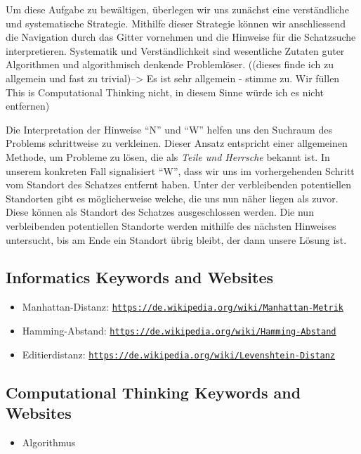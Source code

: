 \documentclass[a4paper,11pt]{report}
\newcommand{\BrochureUrlText}[1]{\texttt{#1}}
\begin{document}
Um diese Aufgabe zu bewältigen, überlegen wir uns zunächst eine verständliche und systematische Strategie. Mithilfe dieser Strategie können wir anschliessend die Navigation durch das Gitter vornehmen und die Hinweise für die Schatzsuche interpretieren. Systematik und Verständlichkeit sind wesentliche Zutaten guter Algorithmen und algorithmisch denkende Problemlöser. ((dieses finde ich zu allgemein und fast zu trivial)–> Es ist sehr allgemein - stimme zu. Wir füllen This is Computational Thinking nicht, in diesem Sinne würde ich es nicht entfernen)

Die Interpretation der Hinweise \enquote{N} und \enquote{W} helfen uns den Suchraum des Problems schrittweise zu verkleinen. Dieser Ansatz entspricht einer allgemeinen Methode, um Probleme zu lösen, die als \emph{Teile und Herrsche} bekannt ist. In unserem konkreten Fall signalisiert \enquote{W}, dass wir uns im vorhergehenden Schritt vom Standort des Schatzes entfernt haben. Unter der verbleibenden potentiellen Standorten gibt es möglicherweise welche, die uns nun näher liegen als zuvor. Diese können als Standort des Schatzes ausgeschlossen werden. Die nun verbleibenden potentiellen Standorte werden mithilfe des nächsten Hinweises untersucht, bis am Ende ein Standort übrig bleibt, der dann unsere Lösung ist.


\subsection*{Informatics Keywords and Websites}

\begin{itemize}
  \item Manhattan-Distanz: \href{https://de.wikipedia.org/wiki/Manhattan-Metrik}{\BrochureUrlText{https://de.wikipedia.org/wiki/Manhattan-Metrik}}
  \item Hamming-Abstand: \href{https://de.wikipedia.org/wiki/Hamming-Abstand}{\BrochureUrlText{https://de.wikipedia.org/wiki/Hamming-Abstand}}
  \item Editierdistanz: \href{https://de.wikipedia.org/wiki/Levenshtein-Distanz}{\BrochureUrlText{https://de.wikipedia.org/wiki/Levenshtein-Distanz}}
\end{itemize}


\subsection*{Computational Thinking Keywords and Websites}

\begin{itemize}
  \item Algorithmus
\end{itemize}
\end{document}
